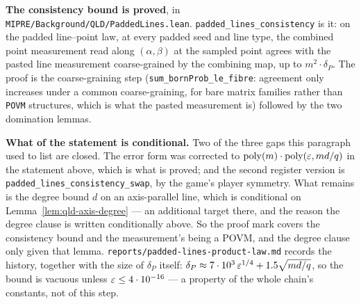 \textbf{The consistency bound is proved}, in
\texttt{MIPRE/Background/QLD/PaddedLines.lean}. \texttt{padded\_lines\_consistency} is it: on the
padded line--point law, at every padded seed and line type, the combined point measurement read along
$(\alpha,\beta)$ at the sampled point agrees with the pasted line measurement coarse-grained by the
combining map, up to $m^2 \cdot \delta_P$. The proof is the coarse-graining step
(\texttt{sum\_bornProb\_le\_fibre}: agreement only increases under a common coarse-graining, for
bare matrix families rather than \texttt{POVM} structures, which is what the pasted measurement is)
followed by the two domination lemmas.

\textbf{What of the statement is conditional.} Two of the three gaps this paragraph used to
list are closed. The error form was corrected to $\mathrm{poly}(m)\cdot\mathrm{poly}(\varepsilon,md/q)$ in the statement
above, which is what is proved; and the second register version is
\texttt{padded\_lines\_consistency\_swap}, by the game's player symmetry. What remains is the
degree bound $d$ on an axis-parallel line, which is conditional on
Lemma~\ref{lem:qld-axis-degree} --- an additional target there, and the reason the degree clause
is written conditionally above. So the proof mark covers the consistency bound and the measurement's
being a POVM, and the degree clause only given that lemma.
\texttt{reports/padded-lines-product-law.md} records the history, together with the size of
$\delta_P$ itself: $\delta_P \approx 7\cdot10^3\,\varepsilon^{1/4} + 1.5\sqrt{md/q}$, so the bound is
vacuous unless $\varepsilon \leq 4\cdot 10^{-16}$ --- a property of the whole chain's constants, not of
this step.

\effortMedium

